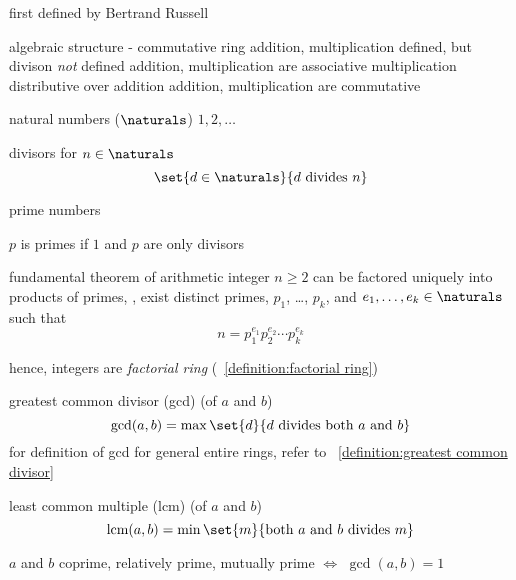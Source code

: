\documentclass[17pt,landscape]{foils}
\begin{document}
{	\bit
	\vitem
		first defined by Bertrand Russell

	\vitem
		algebraic structure - commutative ring
		\bit
		\vitem [-]
			addition, multiplication defined, but divison \emph{not} defined
		\vitem [-]
			addition, multiplication are associative
		\vitem [-]
			multiplication distributive over addition
		\vitem [-]
			addition, multiplication are commutative
		\eit
	\eit

\vitem
	natural numbers ($\naturals$)
	\bit
	\vitem
		$1, 2, \ldots$
	\eit
\eit



\bit
	\item divisors for $n\in\naturals$
	\[
		\set{d\in\naturals}{ d \mbox{ divides } n}
	\]

	\vitem prime numbers
	\bit
		\item $p$ is primes if $1$ and $p$ are only divisors
	\eit
\eit



\begin{mytheorem}{fundamental theorem of arithmetic}%
	integer $n\geq2$ can be factored uniquely into products of primes,
	\ie,
	exist distinct primes, $p_1$, \ldots, $p_k$, and $e_1,\ldots, e_k\in\naturals$
	such that
	$$
		n = p_1^{e_1} p_2^{e_2} \cdots p_k^{e_k}
	$$
\end{mytheorem}

\bit
\vitem
	hence,
	integers are \emph{factorial ring}
	(~\ref{definition:factorial ring})
\eit
\vfill



\bit
\item
	greatest common divisor (gcd) (of $a$ and $b$)%
	\[
		\gcd(a,b) = \max \set{d}{d\mbox{ divides both }a \mbox{ and } b}
	\]
	\bit
	\vitem
		for definition of gcd
		for general entire rings,
		refer to ~\ref{definition:greatest common divisor}
	\eit

\vitem
	least common multiple (lcm) (of $a$ and $b$)%
	\[
		\mbox{lcm}(a,b) = \min \set{m}{\mbox{both } a \mbox{ and } b \mbox{ divides }m}
	\]

\vitem
	$a$ and $b$ coprime, relatively prime, mutually prime $\Leftrightarrow$ $\gcd(a,b)=1$
\eit
\vfill


}
\end{document}
